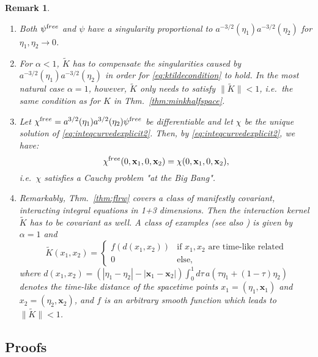 \documentclass[b5paper,draft,openbib,12pt]{memoir}
\newtheorem{Remark}[Def]{Remark}
\newcommand{\vx}{\mathbf{x}}
\newcommand{\free}{{\textup free}}
\begin{document}
\begin{Remark}
\begin{enumerate}
	\item Both $\psi^\free$ and $\psi$ have a singularity proportional to $a^{-3/2}(\eta_1)a^{-3/2}(\eta_2)$ for $\eta_1, \eta_2 \rightarrow 0$.
%
	\item For $\alpha < 1$, $\widetilde{K}$ has to compensate the singularities caused by $a^{-3/2}(\eta_1) a^{-3/2}(\eta_2)$ in order for \eqref{eq:ktildecondition} to hold. In the most natural case $\alpha = 1$, however, $\widetilde{K}$ only needs to satisfy $\| \widetilde{K} \| < 1$, i.e.\, the same condition as for $K$ in Thm.\ \ref{thm:minkhalfspace}. 
%
	\item Let $\chi^\free = a^{3/2}(\eta_1) a^{3/2}(\eta_2) \psi^\free$ be differentiable and let $\chi$ be the unique solution of \eqref{eq:inteqcurvedexplicit2}. Then, by \eqref{eq:inteqcurvedexplicit2}, we have:
  \begin{equation}
		\chi^\free(0,\vx_1,0,\vx_2) = \chi(0,\vx_1,0,\vx_2),
	\end{equation}
	i.e.\, $\chi$ satisfies a Cauchy problem "at the Big Bang".
%
  \item Remarkably, Thm.\ \ref{thm:flrw} covers a class of manifestly 
  covariant, interacting integral equations in 1+3 dimensions. Then 
  the interaction kernel $\widetilde{K}$ has to be covariant as 
  well. A class of examples (see also \cite{lienertcurved}) is 
  given by $\alpha = 1$ and 
  \begin{equation}
	\widetilde{K}(x_1,x_2) = \left\{ \begin{array}{cl} f(d(x_1,x_2))& \text{if } x_1, x_2 \text{ are time-like related}\\ 0 &  \text{else}, \end{array} \right.
\end{equation}
where $d(x_1,x_2) = (|\eta_1-\eta_2| -|\vx_1-\vx_2|) \int_0^1 d 
\tau \, a(\tau \eta_1 + (1-\tau) \eta_2)$ denotes the time-like 
distance of the spacetime points $x_1 = (\eta_1,\vx_1)$ and 
$x_2 = (\eta_2,\vx_2)$, and $f$ is an arbitrary smooth function 
which leads to $\| \widetilde{K} \| < 1$.

\end{enumerate}
\end{Remark}


\subsection{Proofs} \label{sec:proofs}
\end{document}
